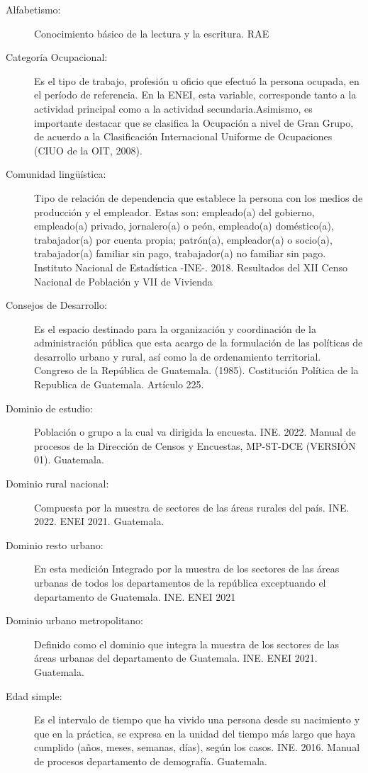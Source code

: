 \begin{description}
	\item[Alfabetismo:] Conocimiento básico de la lectura y la escritura. RAE
	\item[Categoría Ocupacional:] Es el tipo de trabajo, profesión u oficio que efectuó la persona ocupada, en el período de referencia. En la ENEI, esta variable, corresponde tanto a la actividad principal como a la actividad secundaria.Asimismo, es importante destacar que se clasifica la Ocupación a nivel de Gran Grupo, de acuerdo a la Clasificación Internacional Uniforme de Ocupaciones (CIUO de la OIT, 2008).
	\item[Comunidad lingüística:] Tipo de relación de dependencia que establece la persona con los medios de producción y el empleador. Estas son: empleado(a) del gobierno, empleado(a) privado, jornalero(a) o peón, empleado(a) doméstico(a), trabajador(a) por cuenta propia; patrón(a), empleador(a) o socio(a), trabajador(a) familiar sin pago, trabajador(a) no familiar sin pago. Instituto Nacional de Estadística -INE-. 2018. Resultados del XII Censo Nacional de Población y VII de Vivienda
	\item[Consejos de Desarrollo:] Es el espacio destinado para la organización y coordinación de la administración pública que esta acargo de la formulación de las políticas de desarrollo urbano y rural, así como la de ordenamiento territorial. Congreso de la República de Guatemala. (1985). Costitución Política de la Republica de Guatemala. Artículo 225.
	\item[Dominio de estudio:] Población o grupo a la cual va dirigida la encuesta. INE. 2022. Manual de procesos de la Dirección de Censos y Encuestas, MP-ST-DCE (VERSIÓN 01). Guatemala.
	\item[Dominio rural nacional:] Compuesta por la muestra de sectores de las áreas rurales del país. INE. 2022. ENEI 2021. Guatemala.
	\item[Dominio resto urbano:] En esta medición Integrado por la muestra de los sectores de las áreas urbanas de todos los departamentos de la república exceptuando el departamento de Guatemala. INE. ENEI 2021
	\item[Dominio urbano metropolitano:] Definido como el dominio que integra la muestra de los sectores de las áreas urbanas del departamento de Guatemala. INE. ENEI 2021. Guatemala.
	\item[Edad simple:] Es el intervalo de tiempo que ha vivido una persona desde su nacimiento y que en la práctica, se expresa en la unidad del tiempo más largo que haya cumplido (años, meses, semanas, días), según los casos. INE. 2016. Manual de procesos departamento de demografía. Guatemala.

\end{description}
